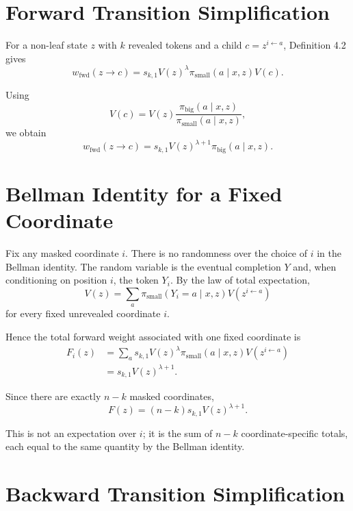 \documentclass[11pt]{article}
\newcommand{\pb}{\pi_{\mathrm{big}}}
\newcommand{\ps}{\pi_{\mathrm{small}}}
\begin{document}
\section{Forward Transition Simplification}

For a non-leaf state $z$ with $k$ revealed tokens and a child $c=z^{i\leftarrow a}$, Definition 4.2 gives
\begin{equation}
w_{\mathrm{fwd}}(z\to c)
=
 s_{k,1}
 V(z)^\lambda
 \ps(a\mid x,z)
 V(c).
\end{equation}

Using
\begin{equation}
V(c)
=
V(z)
\frac{\pb(a\mid x,z)}{\ps(a\mid x,z)},
\end{equation}
we obtain
\begin{equation}
\boxed{
w_{\mathrm{fwd}}(z\to c)
=
 s_{k,1}
 V(z)^{\lambda+1}
 \pb(a\mid x,z).
}
\end{equation}

\section{Bellman Identity for a Fixed Coordinate}

Fix any masked coordinate $i$.
There is no randomness over the choice of $i$ in the Bellman identity.
The random variable is the eventual completion $Y$ and, when conditioning on position $i$, the token $Y_i$.
By the law of total expectation,
\begin{equation}
\boxed{
V(z)
=
\sum_a
\ps(Y_i=a\mid x,z)
V(z^{i\leftarrow a})
}
\end{equation}
for every fixed unrevealed coordinate $i$.

Hence the total forward weight associated with one fixed coordinate is
\begin{align}
F_i(z)
&=
\sum_a
 s_{k,1}
 V(z)^\lambda
 \ps(a\mid x,z)
 V(z^{i\leftarrow a})\\
&=
 s_{k,1}V(z)^{\lambda+1}.
\end{align}

Since there are exactly $n-k$ masked coordinates,
\begin{equation}
\boxed{
F(z)
=
(n-k)s_{k,1}V(z)^{\lambda+1}.
}
\end{equation}

This is not an expectation over $i$; it is the sum of $n-k$ coordinate-specific totals, each equal to the same quantity by the Bellman identity.

\section{Backward Transition Simplification}
\end{document}
